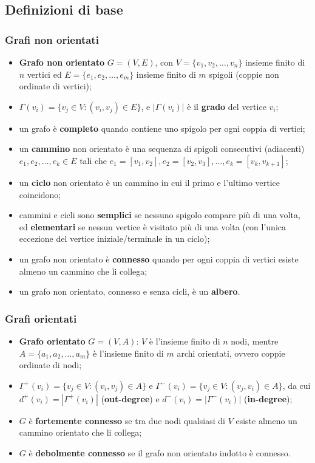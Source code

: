 \subsection{Definizioni di base}
\subsubsection*{Grafi non orientati}
\begin{itemize}
	\item \textbf{Grafo non orientato} $G=(V,E)$, con $V=\{v_1,v_2,\dots,v_n\}$ insieme finito di $n$ vertici ed $E=\{e_1,e_2,\dots,e_m\}$ insieme finito di $m$ spigoli (coppie non ordinate di vertici);
	\item $\Gamma (v_i)=\{v_j\in V:(v_i,v_j)\in E\}$, e $|\Gamma (v_i)|$ è il \textbf{grado} del vertice $v_i$;
	\item un grafo è \textbf{completo} quando contiene uno spigolo per ogni coppia di vertici;
	\item un \textbf{cammino} non orientato è una sequenza di spigoli consecutivi (adiacenti) $e_1,e_2,\dots,e_k\in E$ tali che $e_1=[v_1,v_2],e_2=[v_2,v_3],\dots,e_k=[v_k,v_{k+1}]$;
	\item un \textbf{ciclo} non orientato è un cammino in cui il primo e l'ultimo vertice coincidono;
	\item cammini e cicli sono \textbf{semplici} se nessuno spigolo compare più di una volta, ed \textbf{elementari} se nessun vertice è visitato più di una volta (con l'unica eccezione del vertice iniziale/terminale in un ciclo);
	\item un grafo non orientato è \textbf{connesso} quando per ogni coppia di vertici esiste almeno un cammino che li collega;
	\item un grafo non orientato, connesso e senza cicli, è un \textbf{albero}.
\end{itemize}

\subsubsection*{Grafi orientati}
\begin{itemize}
	\item \textbf{Grafo orientato} $G=(V,A)$: $V$ è l'insieme finito di $n$ nodi, mentre $A=\{a_1,a_2,\dots,a_m\}$ è l'insieme finito di $m$ archi orientati, ovvero coppie ordinate di nodi;
	\item $\Gamma^+(v_i)=\{v_j\in V:(v_i,v_j)\in A\}$ e $\Gamma^-(v_i)=\{v_j\in V:(v_j,v_i)\in A\}$, da cui $d^+(v_i)=|\Gamma^+(v_i)|$ (\textbf{out-degree}) e $d^-(v_i)=|\Gamma^-(v_i)|$ (\textbf{in-degree});
	\item $G$ è \textbf{fortemente connesso} se tra due nodi qualsiasi di $V$ esiste almeno un cammino orientato che li collega;
	\item $G$ è \textbf{debolmente connesso} se il grafo non orientato indotto è connesso.
\end{itemize}

